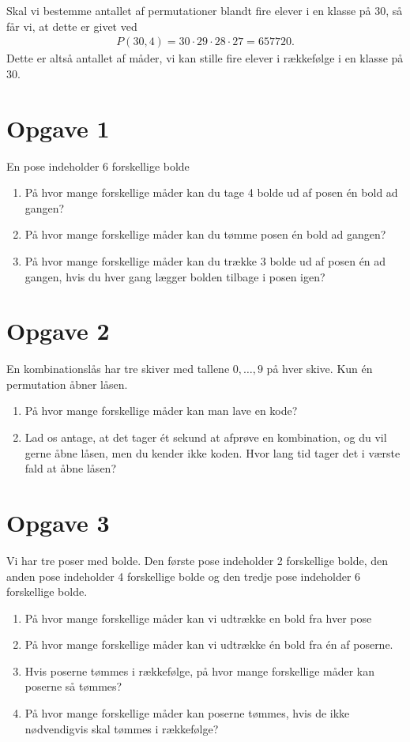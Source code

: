 \begin{exa}
	Skal vi bestemme antallet af permutationer blandt fire elever i en klasse på 30, så får vi, at dette er givet ved
	\begin{align*}
		P(30,4) = 30\cdot 29 \cdot 28 \cdot 27 = 657720.
	\end{align*}
	Dette er altså antallet af måder, vi kan stille fire elever i rækkefølge i en klasse på 30. 
\end{exa}


\section*{Opgave 1}
En pose indeholder 6 forskellige bolde
\begin{enumerate}[label=\roman*)]
	\item På hvor mange forskellige måder kan du tage 4 bolde ud af posen én bold ad gangen?
	\item På hvor mange forskellige måder kan du tømme posen én bold ad gangen?
	\item På hvor mange forskellige måder kan du trække 3 bolde ud af posen én ad gangen, hvis du hver gang lægger bolden tilbage i posen igen?
\end{enumerate}




\section*{Opgave 2}
En kombinationslås har tre skiver med tallene $0,\hdots, 9$ på hver skive. Kun én permutation åbner låsen.
\begin{enumerate}[label=\roman*)]
\item På hvor mange forskellige måder kan man lave en kode?
\item Lad os antage, at det tager ét sekund at afprøve en kombination, og du vil gerne åbne låsen, men du kender ikke koden. Hvor lang tid tager det i værste fald at åbne låsen?
\end{enumerate}

\section*{Opgave 3}
Vi har tre poser med bolde. Den første pose indeholder 2 forskellige bolde, den anden pose indeholder 4 forskellige bolde og den tredje pose indeholder 6 forskellige bolde. 

\begin{enumerate}[label=\roman*)]
	\item På hvor mange forskellige måder kan vi udtrække en bold fra hver pose
	\item På hvor mange forskellige måder kan vi udtrække én bold fra én af poserne. 
	\item Hvis poserne tømmes i rækkefølge, på hvor mange forskellige måder kan poserne så tømmes?
	\item På hvor mange forskellige måder kan poserne tømmes, hvis de ikke nødvendigvis skal tømmes i rækkefølge?
\end{enumerate}

